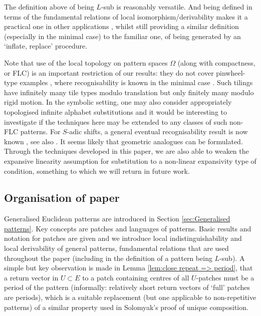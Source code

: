 \documentclass[11pt]{amsart}
\numberwithin{equation}{section}
\theoremstyle{plain}
\theoremstyle{definition}
\begin{document}
The definition above of being \(L\)-sub is reasonably versatile. And being defined in terms of the fundamental relations of local isomorphism/derivability makes it a practical one in other applications \cite{HKW25}, whilst still providing a similar definition (especially in the minimal case) to the familiar one, of being generated by an `inflate, replace' procedure.

Note that use of the local topology on pattern spaces \(\Omega\) (along with compactness, or FLC) is an important restriction of our results: they do not cover pinwheel-type examples \cite{Rad94}, where recognisability is known in the minimal case \cite{HRS05}. Such tilings have infinitely many tile types modulo translation but only finitely many modulo rigid motion. In the symbolic setting, one may also consider appropriately topologised infinite alphabet substitutions \cite{DOP18,MRW25} and it would be interesting to investigate if the techniques here may be extended to any classes of such non-FLC patterns. For \(S\)-adic shifts, a general eventual recognisability result is now known \cite{BPRS25}, see also \cite{BSTY19}. It seems likely that geometric analogues can be formulated. Through the techniques developed in this paper, we are also able to weaken the expansive linearity assumption for substitution to a non-linear expansivity type of condition, something to which we will return in future work.

\subsection{Organisation of paper}

Generalised Euclidean patterns are introduced in Section \ref{sec:Generalised patterns}. Key concepts are patches and languages of patterns. Basic results and notation for patches are given and we introduce local indistinguishability and local derivability of general patterns, fundamental relations that are used throughout the paper (including in the definition of a pattern being \(L\)-sub). A simple but key observation is made in Lemma \ref{lem:close repeat => period}, that a return vector in \(U \subset E\) to a patch containing centres of all \(U\)-patches must be a period of the pattern (informally: relatively short return vectors of `full' patches are periods), which is a suitable replacement (but one applicable to non-repetitive patterns) of a similar property used in Solomyak's proof \cite{Sol98} of unique composition.
\end{document}
